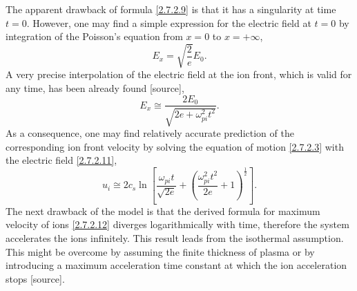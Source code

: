 The apparent drawback of formula \ref{2.7.2.9} is that it has a singularity at time $ t = 0 $. However, one may find a simple expression for the electric field at $ t = 0 $ by integration of the Poisson's equation from $ x = 0 $ to $ x = +\infty $,
\begin{equation}
\label{2.7.2.10}
E_x = \sqrt{\frac{2}{e}} E_0.
\end{equation}
A very precise interpolation of the electric field at the ion front, which is valid for any time, has been already found [source],
\begin{equation}
\label{2.7.2.11}
E_x \cong \frac{2 E_0}{\sqrt{2e + \omega_{pi}^2 t^2}}.
\end{equation}
As a consequence, one may find relatively accurate prediction of the corresponding ion front velocity by solving the equation of motion \ref{2.7.2.3} with the electric field \ref{2.7.2.11},
\begin{equation}
\label{2.7.2.12}
u_i \cong 2 c_s \ln \left[ \frac{\omega_{pi} t}{\sqrt{2 e}} + \left(\frac{\omega_{pi}^2 t^2}{2 e} + 1 \right)^{\frac{1}{2}} \right].
\end{equation}
The next drawback of the model is that the derived formula for maximum velocity of ions \ref{2.7.2.12} diverges logarithmically with time, therefore the system accelerates the ions infinitely. This result leads from the isothermal assumption. This might be overcome by assuming the finite thickness of plasma or by introducing a maximum acceleration time constant at which the ion acceleration stops [source].